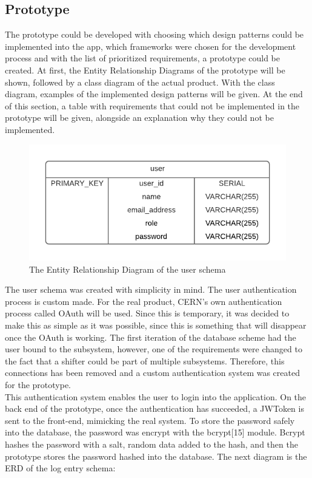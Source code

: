 \documentclass[paper=a4, fontsize=11pt,twoside]{scrartcl}	%
\begin{document}
\subsection{Prototype}
\vspace{-1cm}
The prototype could be developed with choosing which design patterns could be implemented into the app, which frameworks were chosen for the development process and with the list of prioritized requirements, a prototype could be created.  At first, the Entity Relationship Diagrams of the prototype will be shown, followed by a class diagram of the actual product. With the class diagram, examples of the implemented design patterns will be given. At the end of this section, a table with requirements that could not be implemented in the prototype will be given, alongside an explanation why they could not be implemented.
\noindent
\begin{figure}[H]
\centering
\includegraphics[scale=1.0]{erd_user}
\caption{The Entity Relationship Diagram of the user schema}
\end{figure}
\noindent
The user schema was created with simplicity in mind. The user authentication process is custom made. For the real product, CERN's own authentication process called OAuth will be used. Since this is temporary, it was decided to make this as simple as it was possible, since this is something that will disappear once the OAuth is working. The first iteration of the database scheme had the user bound to the subsystem, however, one of the requirements were changed to the fact that a shifter could be part of multiple subsystems. Therefore, this connections has been removed and a custom authentication system was created for the prototype. \\
This authentication system enables the user to login into the application. On the back end of the prototype, once the authentication has succeeded, a JWToken is sent to the front-end, mimicking the real system. To store the password safely into the database, the password was encrypt with the bcrypt[15] module. Bcrypt hashes the password with a salt, random data added to the hash, and then the prototype stores the password hashed into the database. The next diagram is the ERD of the log entry schema:
\end{document}
